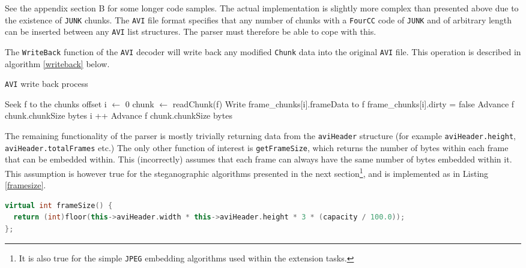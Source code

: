 \documentclass[paper=a4, fontsize=11pt,twoside]{scrartcl}
\numberwithin{table}{section}
\numberwithin{figure}{section}
\numberwithin{algorithm}{section}
\begin{document}
See the appendix section B for some longer code samples. The actual implementation is slightly more complex than presented above due to the existence of \texttt{JUNK} chunks. The \texttt{AVI} file format specifies that any number of chunks with a \texttt{FourCC} code of \texttt{JUNK} and of arbitrary length can be inserted between any \texttt{AVI} list structures. The parser must therefore be able to cope with this.

The \texttt{WriteBack} function of the \texttt{AVI} decoder will write back any modified \texttt{Chunk} data into the original \texttt{AVI} file. This operation is described in algorithm \ref{writeback} below.

\begin{algorithm}[!h]
\caption{\texttt{AVI} write back process}
\label{writeback}
\begin{algorithmic}[1]
\State Seek f to the chunks offset
\State i $\gets$ 0
	\State chunk $\gets$ readChunk(f)
			\State Write frame\_chunks[i].frameData to f
			\State frame\_chunks[i].dirty = false
		\Else
			\State Advance f chunk.chunkSize bytes
		\EndIf
		\State i ++
	\Else
		\State Advance f chunk.chunkSize bytes
	\EndIf
\EndWhile
\end{algorithmic}
\end{algorithm}

The remaining functionality of the parser is mostly trivially returning data from the \texttt{aviHeader} structure (for example \texttt{aviHeader.height}, \texttt{aviHeader.totalFrames} etc.) The only other function of interest is \texttt{getFrameSize}, which returns the number of bytes within each frame that can be embedded within. This (incorrectly) assumes that each frame can always have the same number of bytes embedded within it. This assumption is however true for the steganographic algorithms presented in the next section\footnote{It is also true for the simple \texttt{JPEG} embedding algorithms used within the extension tasks.}, and is implemented as in Listing \ref{framesize}.

\begin{lstlisting}[language=C++, caption={\texttt{AVI} decoder \texttt{frameSize} function (\texttt{video/avi\_decoder.cc:298})}, frame=single, label=framesize]
virtual int frameSize() {
  return (int)floor(this->aviHeader.width * this->aviHeader.height * 3 * (capacity / 100.0));
};
\end{lstlisting}
\end{document}
